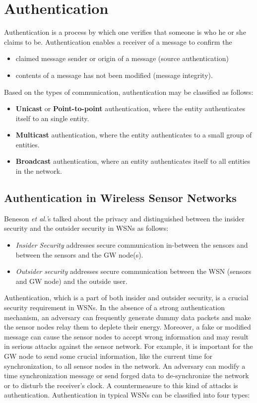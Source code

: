 \documentclass[a4paper,12pt]{report}
\begin{document}
\section{Authentication}
Authentication is a process by which one verifies that someone is
who he or she claims to be. Authentication enables a receiver of a
message to confirm the

\begin{itemize}
\item claimed message sender or origin of a message (source authentication)
\item contents of a message has not been modified (message integrity).
\end{itemize}

\noindent Based on the types of communication, authentication may be
classified as follows:

\begin{itemize}
\item \textbf{Unicast} or \textbf{Point-to-point} authentication, where the entity authenticates itself to an single entity.
\item \textbf{Multicast} authentication, where the entity authenticates to a small group of entities.
\item \textbf{Broadcast} authentication, where an entity authenticates itself to all entities in the network.
\end{itemize}

\subsection{Authentication in Wireless Sensor Networks}
Beneson \textit{et al.'}s \cite{benenson} talked about the privacy
and distinguished between the insider security and the outsider
security in WSNs as follows:


\begin{itemize}
\item \textit{Insider Security} addresses secure communication in-between the sensors and between the sensors and the GW node(s).
\item \textit{Outsider security} addresses secure communication between the WSN (sensors and GW node) and the outside user.
\end{itemize}
Authentication, which is a part of both insider and outsider
security, is a crucial security requirement in WSNs. In the absence
of a strong authentication mechanism, an adversary can frequently
generate dummy data packets and make the sensor nodes relay them to
deplete their energy. Moreover, a fake or modified message can cause
the sensor nodes to accept wrong information and may result in
serious attacks against the sensor network. For example, it is
important for the GW node to send some crucial information, like the
current time for synchronization, to all sensor nodes in the
network. An adversary can modify a time synchronization message or
send forged data to de-synchronize the network or to disturb the
receiver's clock. A countermeasure to this kind of attacks is
authentication. Authentication in typical WSNs can be classified
into four types:
\end{document}

